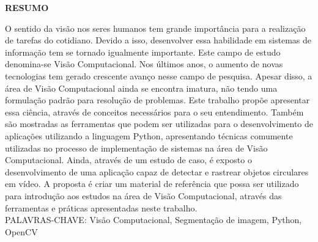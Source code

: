 \begin{center}
	\textbf{RESUMO}
\end{center}

\singlespacing

\noindent O sentido da visão nos seres humanos tem grande importância para a realização de tarefas do cotidiano. Devido a isso, desenvolver essa habilidade em sistemas de informação tem se tornado igualmente importante. Este campo de estudo denomina-se Visão Computacional. Nos últimos anos, o aumento de novas tecnologias tem gerado crescente avanço nesse campo de pesquisa. Apesar disso, a área de Visão Computacional ainda se encontra imatura, não tendo uma formulação padrão para resolução de problemas. Este trabalho propõe apresentar essa ciência, através de conceitos necessários para o seu entendimento. Também são mostradas as ferramentas que podem ser utilizadas para o desenvolvimento de aplicações utilizando a linguagem Python, apresentando técnicas comumente utilizadas no processo de implementação de sistemas na área de Visão Computacional. Ainda, através de um estudo de caso, é exposto o desenvolvimento de uma aplicação capaz de detectar e rastrear objetos circulares em vídeo. A proposta é criar um material de referência que possa ser utilizado para introdução aos estudos na área de Visão Computacional, através das ferramentas e práticas apresentadas neste trabalho. \\

\noindent PALAVRAS-CHAVE: Visão Computacional, Segmentação de imagem, Python, OpenCV
